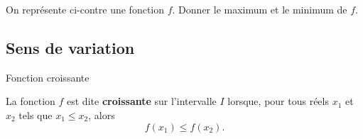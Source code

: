 \documentclass[11pt]{article}
\begin{document}
    \begin{app}
  \begin{minipage}{.6\textwidth}
    On représente ci-contre une fonction $f$. Donner le maximum et le minimum de
    $f$.
  \end{minipage}
  \begin{minipage}{.4\textwidth}
    \begin{center}
    \end{center}
  \end{minipage}
    \end{app}

\subsection{Sens de variation}
\begin{defi}{Fonction croissante}
  \begin{minipage}{.5\textwidth}
    La fonction $f$ est dite \textbf{croissante} sur l'intervalle $I$ lorsque,
    pour tous réels $x_1$ et $x_2$ tels que $x_1\leq x_2$, alors
    \[
      f(x_1)\leq f(x_2).
    \]
  \end{minipage}
  \begin{minipage}{.5\textwidth}
    \begin{center}
    \end{center}
  \end{minipage}
\end{defi}
\end{document}
